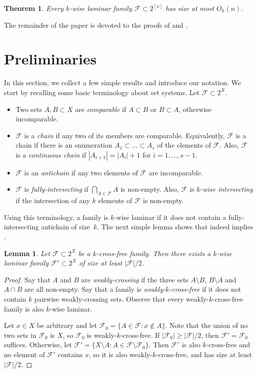 \documentclass[11pt]{article}
\newtheorem{theorem}{Theorem}[section]
\newtheorem{lemma}[lemma]{Lemma}
\theoremstyle{definition}
\newcommand{\cF}{\mathcal{F}}
\begin{document}
\begin{theorem}\label{thm:main1}
    Every $k$-wise laminar family $\cF\subset 2^{[n]}$ has size at most $O_k(n)$.
\end{theorem}

\noindent
The remainder of the paper is devoted to the proofs of  and .

\section{Preliminaries}

In this section, we collect a few simple results and introduce our notation. We start by recalling some basic terminology about set systems. Let $\cF\subset 2^X$.
\begin{itemize}
    \item  Two sets $A,B\subset X$ are \emph{comparable} if $A\subset B$ or $B\subset A$, otherwise incomparable.
    \item $\cF$ is a \emph{chain} if any two of its members are comparable. Equivalently, $\cF$ is a chain if there is an enumeration $A_1\subset \dots\subset A_s$ of the elements of $\cF$. Also, $\cF$ is a \emph{continuous chain} if $|A_{i+1}|=|A_i|+1$ for $i=1,\dots,s-1$.
    \item $\cF$ is an  \emph{antichain} if any two elements of $\cF$ are incomparable.
    \item $\cF$ is \emph{fully-intersecting} if $\bigcap_{A\in \cF} A$ is non-empty. Also, $\cF$ is \emph{$k$-wise intersecting} if the intersection of any $k$ elements of $\cF$ is non-empty.
\end{itemize}
Using this terminology, a family is $k$-wise laminar if it does not contain a fully-intersecting antichain of size~$k$. The next simple lemma shows that  indeed implies .

\begin{lemma}\label{lemma:wkcf}
Let $\cF\subset 2^X$ be a $k$-cross-free family. Then there exists a $k$-wise laminar family $\cF'\subset 2^X$ of size at least $|\cF|/2$.
\end{lemma}

\begin{proof}
Say that $A$ and $B$ are \emph{weakly-crossing} if the three sets $A\setminus B$, $B\setminus A$ and $A\cap B$ are all non-empty. Say that a family is \emph{weakly-$k$-cross-free} if it does not contain $k$ pairwise weakly-crossing sets. Observe that every weakly-$k$-cross-free family is also $k$-wise laminar.

Let $x\in X$ be arbitrary and let $\cF_0=\{A\in \cF:x\not\in A\}$. Note that the union of no two sets in $\cF_0$ is $X$, so $\cF_0$ is weakly-$k$-cross-free. If $|\cF_0|\geq |\cF|/2$,  then $\cF'=\cF_0$ suffices. Otherwise, let $\cF'=\{X\setminus A:A\in \cF\setminus\cF_0\}$. Then $\cF'$ is also $k$-cross-free and no element of $\cF'$ contains $x$, so it is also weakly-$k$-cross-free, and has size at least $|\cF|/2$.
\end{proof}
\end{document}
